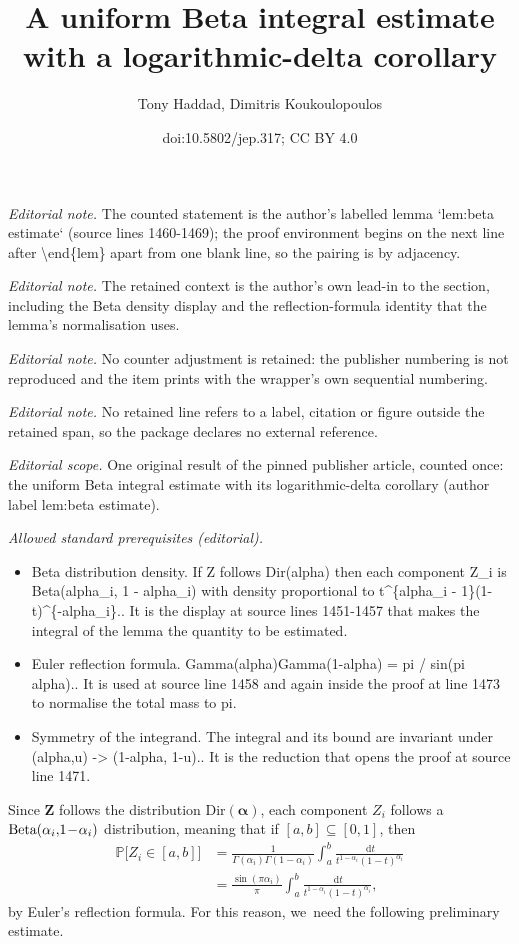 \documentclass[10pt,a4paper]{article}
\title{A uniform Beta integral estimate with a logarithmic-delta corollary}
\author{Tony Haddad, Dimitris Koukoulopoulos}
\date{doi:10.5802/jep.317; CC BY 4.0}
\newcommand{\bZ}{{\boldsymbol Z}}
\newcommand{\PP}{\mathbb{P}}
\newcommand{\boldalpha}{\boldsymbol{\alpha}}
\newcommand{\dee}{\,\mathrm{d}}
\newcommand{\bg}{\big}
\theoremstyle{plain}
\theoremstyle{definition}
\begin{document}
\maketitle
\noindent\textit{Editorial note.} The counted statement is the author's labelled lemma `lem:beta estimate` (source lines 1460-1469); the proof environment begins on the next line after \textbackslash{}end\{lem\} apart from one blank line, so the pairing is by adjacency.\par\medskip
\noindent\textit{Editorial note.} The retained context is the author's own lead-in to the section, including the Beta density display and the reflection-formula identity that the lemma's normalisation uses.\par\medskip
\noindent\textit{Editorial note.} No counter adjustment is retained: the publisher numbering is not reproduced and the item prints with the wrapper's own sequential numbering.\par\medskip
\noindent\textit{Editorial note.} No retained line refers to a label, citation or figure outside the retained span, so the package declares no external reference.\par\medskip
\noindent\textit{Editorial scope.} One original result of the pinned publisher article, counted once: the uniform Beta integral estimate with its logarithmic-delta corollary (author label lem:beta estimate).\par\medskip
\noindent\textit{Allowed standard prerequisites (editorial).}\begin{itemize}
\item Beta distribution density. If Z follows Dir(alpha) then each component Z\_i is Beta(alpha\_i, 1 - alpha\_i) with density proportional to t\textasciicircum{}\{alpha\_i - 1\}(1-t)\textasciicircum{}\{-alpha\_i\}.. It is the display at source lines 1451-1457 that makes the integral of the lemma the quantity to be estimated.
\item Euler reflection formula. Gamma(alpha)Gamma(1-alpha) = pi / sin(pi alpha).. It is used at source line 1458 and again inside the proof at line 1473 to normalise the total mass to pi.
\item Symmetry of the integrand. The integral and its bound are invariant under (alpha,u) -> (1-alpha, 1-u).. It is the reduction that opens the proof at source line 1471.
\end{itemize}\medskip
Since $\bZ$ follows the distribution $\text{Dir}(\boldalpha)$, each component $Z_i$ follows a \hbox{$\text{Beta}(\alpha_i,\mkern-3mu 1 \!-\! \alpha_i)$} distribution, meaning that if $[a,b]\subseteq[0,1]$, then
\begin{equation}
\label{eq:Zi distribution}
\begin{aligned}
\PP\bg[Z_i\in[a,b] \bg] &= \frac{1}{\Gamma(\alpha_i)\Gamma(1-\alpha_i)}\int_a^b \frac{\dee t}{t^{1-\alpha_i} (1-t)^{\alpha_i}}\\
&= \frac{\sin(\pi\alpha_i)}{\pi} \int_a^b \frac{\dee t}{t^{1-\alpha_i} (1-t)^{\alpha_i}},
\end{aligned}
\end{equation}
by Euler's reflection formula. For this reason, we~need the following preliminary estimate.
\end{document}
